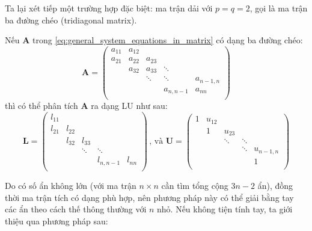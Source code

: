 \documentclass[../../Lectures]{subfiles}
\begin{document}
Ta lại xét tiếp một trường hợp đặc biệt: ma trận dải với \(p = q = 2\), gọi là
ma trận ba đường chéo (tridiagonal matrix).

Nếu \(\bm{A}\) trong \eqref{eq:general_system_equations_in_matrix} có dạng ba
đường chéo:
\[
    \bm{A} =
        \begin{pmatrix}
            a_{11}  &  a_{12}  &          &                &                \\
            a_{21}  &  a_{22}  &  a_{23}  &                &                \\
                    &  a_{32}  &  a_{33}  &     \ddots     &                \\
                    &          &  \ddots  &     \ddots     &  a_{n - 1, n}  \\
                    &          &          &  a_{n, n - 1}  &     a_{nn}     \\
        \end{pmatrix}
\]
thì có thể phân tích \(\bm{A}\) ra dạng LU như sau:
\[
    \bm{L} =
        \begin{pmatrix}
            l_{11}  &          &          &                &          \\
            l_{21}  &  l_{22}  &          &                &          \\
                    &  l_{32}  &  l_{33}  &                &          \\
                    &          &  \ddots  &     \ddots     &          \\
                    &          &          &  l_{n, n - 1}  &  l_{nn}  \\
        \end{pmatrix}
    \, \text{, và }
    \bm{U} =
        \begin{pmatrix}
            1  &  u_{12}  &          &          &                \\
               &    1     &  u_{23}  &          &                \\
               &          &  \ddots  &  \ddots  &                \\
               &          &          &  \ddots  &  u_{n - 1, n}  \\
               &          &          &          &     1          \\

        \end{pmatrix}
\]

Do có số ẩn không lớn (với ma trận \(n \times n\) cần tìm tổng cộng \(3n - 2\)
ẩn), đồng thời ma trận tích có dạng phù hợp, nên phương pháp này có thể giải
bằng tay các ẩn theo cách thế thông thường với \(n\) nhỏ. Nếu không tiện tính
tay, ta giới thiệu qua phương pháp sau:
\end{document}
